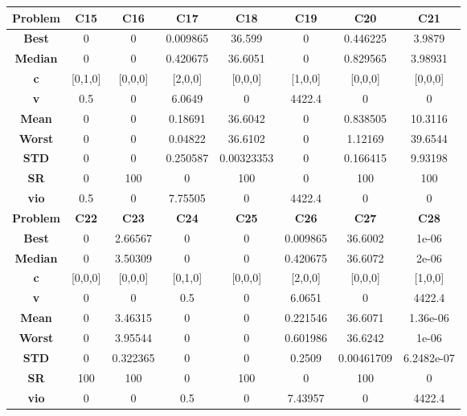\documentclass{IEEEtran}
\begin{document}
\begin{center}
\begin{tabular}{|c|c|c|c|c|c|c|c|}
    \hline 
    \hline 
    \textbf{Problem} & \textbf{C15} & \textbf{C16} & \textbf{C17} & \textbf{C18} & \textbf{C19} & \textbf{C20} & \textbf{C21} \\ 
    \hline\hline 
    \textbf{Best} & 0 & 0 & 0.009865 & 36.599 & 0 & 0.446225 & 3.9879\\ 
    \textbf{Median} & 0 & 0 & 0.420675 & 36.6051 & 0 & 0.829565 & 3.98931\\ 
    \textbf{c} & [0,1,0] & [0,0,0] & [2,0,0] & [0,0,0] & [1,0,0] & [0,0,0] & [0,0,0]\\ 
    \textbf{v} & 0.5 & 0 & 6.0649 & 0 & 4422.4 & 0 & 0\\ 
    \textbf{Mean} & 0 & 0 & 0.18691 & 36.6042 & 0 & 0.838505 & 10.3116\\ 
    \textbf{Worst} & 0 & 0 & 0.04822 & 36.6102 & 0 & 1.12169 & 39.6544\\ 
    \textbf{STD} & 0 & 0 & 0.250587 & 0.00323353 & 0 & 0.166415 & 9.93198\\ 
    \textbf{SR} & 0 & 100 & 0 & 100 & 0 & 100 & 100\\ 
    \textbf{vio} & 0.5 & 0 & 7.75505 & 0 & 4422.4 & 0 & 0\\ 
    \hline 
    \hline 
    \textbf{Problem} & \textbf{C22} & \textbf{C23} & \textbf{C24} & \textbf{C25} & \textbf{C26} & \textbf{C27} & \textbf{C28} \\ 
    \hline\hline 
    \textbf{Best} & 0 & 2.66567 & 0 & 0 & 0.009865 & 36.6002 & 1e-06\\ 
    \textbf{Median} & 0 & 3.50309 & 0 & 0 & 0.420675 & 36.6072 & 2e-06\\ 
    \textbf{c} & [0,0,0] & [0,0,0] & [0,1,0] & [0,0,0] & [2,0,0] & [0,0,0] & [1,0,0]\\ 
    \textbf{v} & 0 & 0 & 0.5 & 0 & 6.0651 & 0 & 4422.4\\ 
    \textbf{Mean} & 0 & 3.46315 & 0 & 0 & 0.221546 & 36.6071 & 1.36e-06\\ 
    \textbf{Worst} & 0 & 3.95544 & 0 & 0 & 0.601986 & 36.6242 & 1e-06\\ 
    \textbf{STD} & 0 & 0.322365 & 0 & 0 & 0.2509 & 0.00461709 & 6.2482e-07\\ 
    \textbf{SR} & 100 & 100 & 0 & 100 & 0 & 100 & 0\\ 
    \textbf{vio} & 0 & 0 & 0.5 & 0 & 7.43957 & 0 & 4422.4\\ 
    \hline 
  \end{tabular}
\end{center}
\newpage
\end{document}
